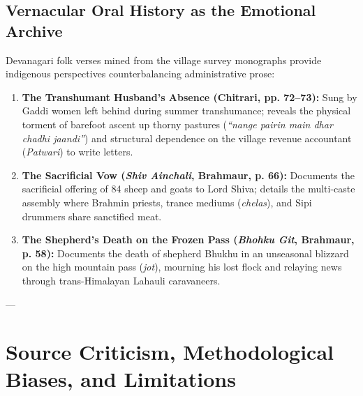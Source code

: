 \documentclass[11pt,a4paper]{article}
\begin{document}
\subsection{Vernacular Oral History as the Emotional Archive}
Devanagari folk verses mined from the village survey monographs provide indigenous perspectives counterbalancing administrative prose:
\begin{enumerate}[leftmargin=*]
    \item \textbf{The Transhumant Husband's Absence (Chitrari, pp. 72--73):} Sung by Gaddi women left behind during summer transhumance; reveals the physical torment of barefoot ascent up thorny pastures (\textit{``nange pairin main dhar chadhi jaandi''}) and structural dependence on the village revenue accountant (\textit{Patwari}) to write letters.
    \item \textbf{The Sacrificial Vow (\textit{Shiv Ainchali}, Brahmaur, p. 66):} Documents the sacrificial offering of 84 sheep and goats to Lord Shiva; details the multi-caste assembly where Brahmin priests, trance mediums (\textit{chelas}), and Sipi drummers share sanctified meat.
    \item \textbf{The Shepherd's Death on the Frozen Pass (\textit{Bhohku Git}, Brahmaur, p. 58):} Documents the death of shepherd Bhukhu in an unseasonal blizzard on the high mountain pass (\textit{jot}), mourning his lost flock and relaying news through trans-Himalayan Lahauli caravaneers.
\end{enumerate}

---

\section{Source Criticism, Methodological Biases, and Limitations}
\end{document}
